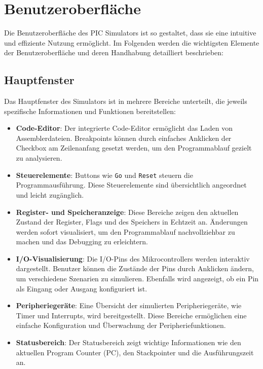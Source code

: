 \chapter{Benutzeroberfläche}

Die Benutzeroberfläche des PIC Simulators ist so gestaltet, dass sie eine intuitive und effiziente Nutzung ermöglicht. Im Folgenden werden die wichtigsten Elemente der Benutzeroberfläche und deren Handhabung detailliert beschrieben:

\section{Hauptfenster}
Das Hauptfenster des Simulators ist in mehrere Bereiche unterteilt, die jeweils spezifische Informationen und Funktionen bereitstellen:
\begin{itemize}
    \item \textbf{Code-Editor}: Der integrierte Code-Editor ermöglicht das Laden von Assemblerdateien. Breakpoints können durch einfaches Anklicken der Checkbox am Zeilenanfang gesetzt werden, um den Programmablauf gezielt zu analysieren.
    \item \textbf{Steuerelemente}: Buttons wie \texttt{Go} und \texttt{Reset} steuern die Programmausführung. Diese Steuerelemente sind übersichtlich angeordnet und leicht zugänglich.
    \item \textbf{Register- und Speicheranzeige}: Diese Bereiche zeigen den aktuellen Zustand der Register, Flags und des Speichers in Echtzeit an. Änderungen werden sofort visualisiert, um den Programmablauf nachvollziehbar zu machen und das Debugging zu erleichtern.
    \item \textbf{I/O-Visualisierung}: Die I/O-Pins des Mikrocontrollers werden interaktiv dargestellt. Benutzer können die Zustände der Pins durch Anklicken ändern, um verschiedene Szenarien zu simulieren. Ebenfalls wird angezeigt, ob ein Pin als Eingang oder Ausgang konfiguriert ist.
    \item \textbf{Peripheriegeräte}: Eine Übersicht der simulierten Peripheriegeräte, wie Timer und Interrupts, wird bereitgestellt. Diese Bereiche ermöglichen eine einfache Konfiguration und Überwachung der Peripheriefunktionen.
    \item \textbf{Statusbereich}: Der Statusbereich zeigt wichtige Informationen wie den aktuellen Program Counter (PC), den Stackpointer und die Ausführungszeit an.
\end{itemize}


